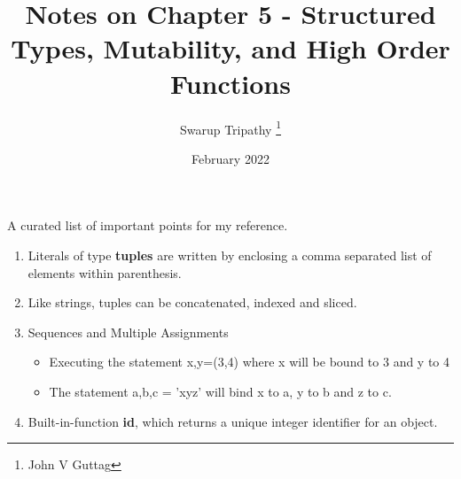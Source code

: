 \documentclass[11pt]{article}
\title{Notes on Chapter 5 - Structured Types, Mutability, and High Order Functions}
\author{Swarup Tripathy \thanks{John V Guttag}}
\date{February 2022}
\begin{document}
    \maketitle
    A curated list of important points for my reference.\\
    \begin{enumerate}
        \item Literals of type \textbf{tuples} are written by enclosing a comma separated list of elements within parenthesis.
        \item Like strings, tuples can be concatenated, indexed and sliced.
        \item Sequences and Multiple Assignments
        \begin{itemize}
            \item Executing the statement x,y=(3,4) where x will be bound to 3 and y to 4
            \item The statement a,b,c = 'xyz' will bind x to a, y to b and z to c.
        \end{itemize}
        \item Built-in-function \textbf{id}, which returns a unique integer identifier for an object.
    \end{enumerate}
\end{document}
